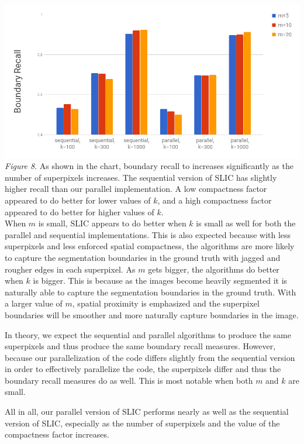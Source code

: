 \documentclass[11pt,twocolumn]{article}
\begin{document}
\includegraphics[width = \linewidth]{boundary_recall.png} \\
\textit{Figure 8}. As shown in the chart, boundary recall to increases significantly as the number of superpixels increases. The sequential version of SLIC has slightly higher recall than our parallel implementation. A low compactness factor appeared to do better for lower values of $k$, and a high compactness factor appeared to do better for higher values of $k$. \\

When $m$ is small, SLIC appears to do better when $k$ is small as well for both the parallel and sequential implementations. This is also expected because with less superpixels and less enforced spatial compactness, the algorithms are more likely to capture the segmentation boundaries in the ground truth with jagged and rougher edges in each superpixel. As $m$ gets bigger, the algorithms do better when $k$ is bigger. This is because as the images become heavily segmented it is naturally able to capture the segmentation boundaries in the ground truth. With a larger value of $m$, spatial proximity is emphasized and the superpixel boundaries will be smoother and more naturally capture boundaries in the image. 

In theory, we expect the sequential and parallel algorithms to produce the same superpixels and thus produce the same boundary recall measures. However, because our parallelization of the code differs slightly from the sequential version in order to effectively parallelize the code, the superpixels differ and thus the boundary recall measures do as well. This is most notable when both $m$ and $k$ are small. 

All in all, our parallel version of SLIC performs nearly as well as the sequential version of SLIC, especially as the number of superpixels and the value of the compactness factor increases.
\end{document}
